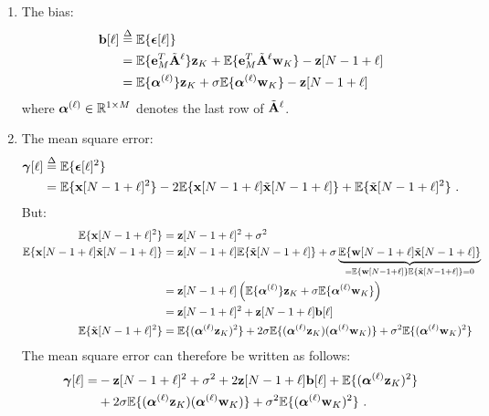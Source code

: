 \begin{enumerate}

\item 
The bias: 
\begin{align}
\nonumber
\bb[\ell]&\defeq\EE\{\bepsilon[\ell]\} \\
\nonumber
&= \EE\{\be_M^T\tilde\bA^\ell\}\bz_{K} + \EE\{\be_M^T\tilde\bA^\ell\bw_{K}\} - \bz[N-1+\ell] \\
&=  \EE\{\balpha^{(\ell)}\}\bz_{K} + \sigma\EE\{\balpha^{(\ell)}\bw_{K}\} - \bz[N-1+\ell]
\label{eq:bias.1}
\end{align}
where $\boldsymbol{\alpha}^{(\ell)}\in{\mathbb R}^{1\times M}$ denotes the last row of $\tilde{{\mathbf A}}^\ell$.

\item 
The mean square error:
\begin{align*}
\boldsymbol{\gamma}[\ell] &\overset{\Delta}{=} {\mathbb E}\{\boldsymbol{\epsilon}[\ell]^2\} \\
&={\mathbb E}\{{\mathbf x}[N-1+\ell]^2\} - 2 {\mathbb E}\{{\mathbf x}[N-1+\ell]\tilde{{\mathbf x}}[N-1+\ell]\} + {\mathbb E}\{\tilde{{\mathbf x}}[N-1+\ell]^2\} \ .
\end{align*}
But:
\begin{align*}
{\mathbb E}\{{\mathbf x}[N-1+\ell]^2\} &= {\mathbf z}[N-1+\ell]^2 +\sigma^2 \\
{\mathbb E}\{{\mathbf x}[N-1+\ell]\tilde{{\mathbf x}}[N-1+\ell]\} &= {\mathbf z}[N-1+\ell]{\mathbb E}\{\tilde{{\mathbf x}}[N-1+\ell]\} + \sigma\underbrace{{\mathbb E}\{{\mathbf w}[N-1+\ell]\tilde{{\mathbf x}}[N-1+\ell]\}}_{={\mathbb E}\{{\mathbf w}[N-1+\ell]\}{\mathbb E}\{\tilde{{\mathbf x}}[N-1+\ell]\}=0} \\
&= {\mathbf z}[N-1+\ell]\left({\mathbb E}\{\boldsymbol{\alpha}^{(\ell)}\}{\mathbf z}_{K} + \sigma{\mathbb E}\{\boldsymbol{\alpha}^{(\ell)}{\mathbf w}_{K}\}\right) \\
&= {\mathbf z}[N-1+\ell]^2 + {\mathbf z}[N-1+\ell]{\mathbf b}[\ell]\\
{\mathbb E}\{\tilde{{\mathbf x}}[N-1+\ell]^2\} &= {\mathbb E}\{(\boldsymbol{\alpha}^{(\ell)}{\mathbf z}_K)^2\} + 2\sigma{\mathbb E}\{(\boldsymbol{\alpha}^{(\ell)}{\mathbf z}_K)(\boldsymbol{\alpha}^{(\ell)}{\mathbf w}_K)\} + \sigma^2{\mathbb E}\{(\boldsymbol{\alpha}^{(\ell)}{\mathbf w}_K)^2\}
\end{align*}
The mean square error can therefore be written as follows:
\begin{align}
\nonumber
\boldsymbol{\gamma}[\ell] =&-{\mathbf z}[N-1+\ell]^2 +\sigma^2 +2{\mathbf z}[N-1+\ell]{\mathbf b}[\ell] +{\mathbb E}\{(\boldsymbol{\alpha}^{(\ell)}{\mathbf z}_K)^2\}  \\
&+ 2\sigma{\mathbb E}\{(\boldsymbol{\alpha}^{(\ell)}{\mathbf z}_K)(\boldsymbol{\alpha}^{(\ell)}{\mathbf w}_K)\} + \sigma^2{\mathbb E}\{(\boldsymbol{\alpha}^{(\ell)}{\mathbf w}_K)^2\}\ .
\end{align}
\end{enumerate}

